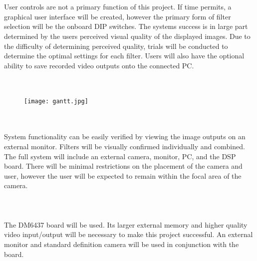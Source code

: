 \documentclass{article}
\begin{document}
\\\\
User controls are not a primary function of this project. If time permits, a graphical user interface will be created, however the primary form of filter selection will be the onboard DIP switches. The systems success is in large part determined by the users perceived visual quality of the displayed images. Due to the difficulty of determining perceived quality, trials will be conducted to determine the optimal settings for each filter. Users will also have the optional ability to save recorded video outputs onto the connected PC.  \\\\
 
\\
\begin{figure}[here]
\texttt{[image: gantt.jpg]} 
\end{figure} 

\pagebreak
{}\\\\
System functionality can be easily verified by viewing the image outputs on an external monitor. Filters will be visually confirmed individually and combined. The full system will include an external camera, monitor, PC, and the DSP board. There will be minimal restrictions on the placement of the camera and user, however the user will be expected to remain within the focal area of the camera. \\\\


\\\\
The DM6437 board will be used. Its larger external memory and higher quality video input/output will be necessary to make this project successful. An external monitor and standard definition camera will be used in conjunction with the board. \\\\
 


\end{document}
